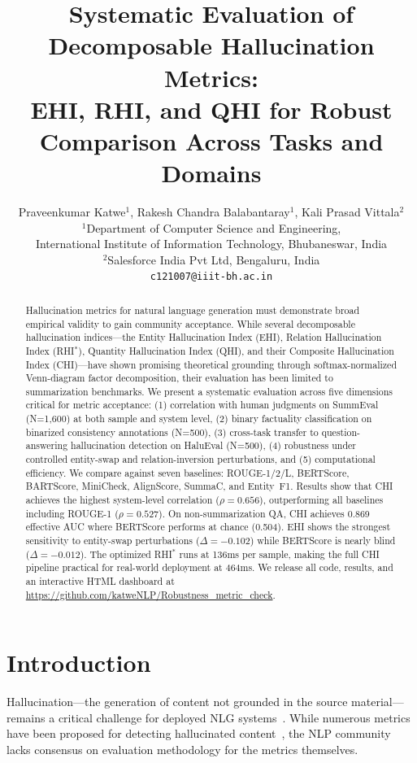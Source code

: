 \documentclass[11pt]{article}
\title{\textbf{Systematic Evaluation of Decomposable Hallucination Metrics:\\EHI, RHI, and QHI for Robust Comparison Across Tasks and Domains}}
\author{
Praveenkumar Katwe$^{1}$, Rakesh Chandra Balabantaray$^{1}$, Kali Prasad Vittala$^{2}$\\
$^{1}$Department of Computer Science and Engineering,\\
International Institute of Information Technology, Bhubaneswar, India\\
$^{2}$Salesforce India Pvt Ltd, Bengaluru, India\\
\texttt{c121007@iiit-bh.ac.in}
}
\date{}
\begin{document}
\maketitle

\begin{abstract}
Hallucination metrics for natural language generation must demonstrate broad empirical validity to gain community acceptance. While several decomposable hallucination indices---the Entity Hallucination Index (EHI), Relation Hallucination Index (RHI$^*$), Quantity Hallucination Index (QHI), and their Composite Hallucination Index (CHI)---have shown promising theoretical grounding through softmax-normalized Venn-diagram factor decomposition, their evaluation has been limited to summarization benchmarks. We present a systematic evaluation across five dimensions critical for metric acceptance: (1) correlation with human judgments on SummEval (N=1,600) at both sample and system level, (2) binary factuality classification on binarized consistency annotations (N=500), (3) cross-task transfer to question-answering hallucination detection on HaluEval (N=500), (4) robustness under controlled entity-swap and relation-inversion perturbations, and (5) computational efficiency. We compare against seven baselines: ROUGE-1/2/L, BERTScore, BARTScore, MiniCheck, AlignScore, SummaC, and Entity~F1. Results show that CHI achieves the highest system-level correlation ($\rho=0.656$), outperforming all baselines including ROUGE-1 ($\rho=0.527$). On non-summarization QA, CHI achieves 0.869 effective AUC where BERTScore performs at chance (0.504). EHI shows the strongest sensitivity to entity-swap perturbations ($\Delta=-0.102$) while BERTScore is nearly blind ($\Delta=-0.012$). The optimized RHI$^*$ runs at 136ms per sample, making the full CHI pipeline practical for real-world deployment at 464ms. We release all code, results, and an interactive HTML dashboard at \url{https://github.com/katweNLP/Robustness_metric_check}.
\end{abstract}

\section{Introduction}

Hallucination---the generation of content not grounded in the source material---remains a critical challenge for deployed NLG systems~\cite{maynez2020faithfulness,ji2023hallucination}. While numerous metrics have been proposed for detecting hallucinated content~\cite{honovich2022true,tang2024minicheck,yuan2021bartscore}, the NLP community lacks consensus on evaluation methodology for the metrics themselves.
\end{document}
